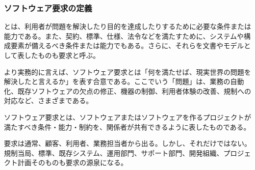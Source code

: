 \subsubsection{ソフトウェア要求の定義}

とは、利用者が問題を解決したり目的を達成したりするために必要な条件または能力である。また、契約、標準、仕様、法令などを満たすために、システムや構成要素が備えるべき条件または能力でもある。さらに、それらを文書やモデルとして表したものも要求と呼ぶ。

より実務的に言えば、ソフトウェア要求とは「何を満たせば、現実世界の問題を解決したと言えるか」を表す合意である。ここでいう「問題」は、業務の自動化、既存ソフトウェアの欠点の修正、機器の制御、利用者体験の改善、規制への対応など、さまざまである。

\begin{definitionbox}ソフトウェア要求とは、ソフトウェアまたはソフトウェアを作るプロジェクトが満たすべき条件・能力・制約を、関係者が共有できるように表したものである。\end{definitionbox}

要求は通常、顧客、利用者、業務担当者から出る。しかし、それだけではない。規制当局、標準、既存システム、運用部門、サポート部門、開発組織、プロジェクト計画そのものも要求の源泉になる。

